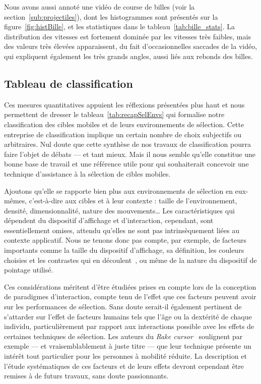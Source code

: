 	Nous avons aussi annoté une vidéo de course de billes (voir la section~\ref{sub:projectiles}), dont les histogrammes sont présentés sur la figure~\ref{fig:histBille}, et les statistiques dans le tableau~\ref{tab:bille_stats}. La distribution des vitesses est fortement dominée par les vitesses très faibles, mais des valeurs très élevées apparaissent, du fait d'occasionnelles saccades de la vidéo, qui expliquent également les très grands angles, aussi liés aux rebonds des billes.
	
	\subsection{Tableau de classification}
	Ces mesures quantitatives appuient les réflexions présentées plus haut et nous permettent de dresser le tableau~\ref{tab:recapSelEnvs} qui formalise notre classification des cibles mobiles et de leurs environnements de sélection. Cette entreprise de classification implique un certain nombre de choix subjectifs ou arbitraires. Nul doute que cette synthèse de nos travaux de classification pourra faire l'objet de débats --- et tant mieux. Mais il nous semble qu'elle constitue une bonne base de travail et une référence utile pour qui souhaiterait concevoir une technique d'assistance à la sélection de cibles mobiles.
	
	Ajoutons qu'elle se rapporte bien plus aux environnements de sélection en eux-mêmes, c'est-à-dire aux cibles et à leur contexte : taille de l'environnement, densité, dimensionnalité, nature des mouvements\ldots{} Les caractéristiques qui dépendent du dispositif d'affichage et d'interaction, cependant, sont essentiellement omises, attendu qu'elles ne sont pas intrinsèquement liées au contexte applicatif. Nous ne tenons donc pas compte, par exemple, de facteurs importants comme la taille du dispositif d'affichage, sa définition, les couleurs choisies et les contrastes qui en découlent~\cite{borst1989principles}, ou même de la nature du dispositif de pointage utilisé.
	
	Ces considérations méritent d'être étudiées prises en compte lors de la conception de paradigmes d'interaction, compte tenu de l'effet que ces facteurs peuvent avoir sur les performances de sélection. Sans doute serait-il également pertinent de s'attarder sur l'effet de facteurs humains tels que l'âge ou la dextérité de chaque individu, particulièrement par rapport aux interactions possible avec les effets de certaines techniques de sélection. Les auteurs du \emph{Rake cursor}~\cite{blanch2009rake} soulignent par exemple --- et vraisemblablement à juste titre --- que leur technique présente un intérêt tout particulier pour les personnes à mobilité réduite. La description et l'étude systématiques de ces facteurs et de leurs effets devront cependant être remises à de futurs travaux, sans doute passionnants.
	
